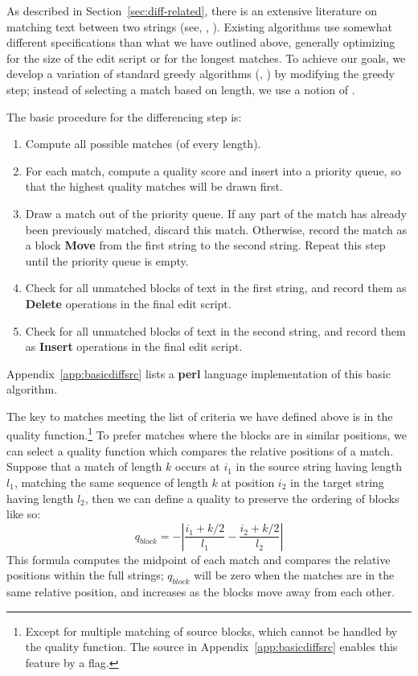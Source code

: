 As described in Section~\ref{sec:diff-related}, there is an extensive
literature on matching text between two strings (see, \eg,
\cite{Hunt1976,Hirschberg1977,Tichy1984,Myers1986,Burns1997}).
Existing algorithms use somewhat different specifications than what
we have outlined above, generally optimizing for the size of the edit
script or for the longest matches.
To achieve our goals, we develop a variation of
standard greedy algorithms (\eg, \cite{Hirschberg1977,Myers1986,Burns1997})
by modifying the greedy step; instead of selecting a match
based on length, we use a notion of .

The basic procedure for the differencing step is:
\begin{enumerate}
\item Compute all possible matches (of every length).
\item For each match, compute a quality score and insert into
    a priority queue, so that the highest quality matches will
    be drawn first.
\item Draw a match out of the priority queue.
    If any part of the match has already been previously matched,
    discard this match.
    Otherwise, record the match as a block \textbf{Move}
    from the first string to the second string.
    Repeat this step until the priority queue is empty.
\item Check for all unmatched blocks of text in the first
    string, and record them as \textbf{Delete} operations
    in the final edit script.
\item Check for all unmatched blocks of text in the second
    string, and record them as \textbf{Insert} operations
    in the final edit script.
\end{enumerate}
Appendix~\ref{app:basicdiffsrc} lists a
\textbf{perl} language implementation of this basic algorithm.

The key to matches meeting the list of criteria we have
defined above is in the quality function.\footnote{Except for
multiple matching of source blocks, which cannot be handled
by the quality
function.  The source in Appendix~\ref{app:basicdiffsrc}
enables this feature by a flag.}
To prefer matches where the blocks are in similar positions,
we can select a quality function which compares the relative
positions of a match.
Suppose that a match of length $k$ occurs at $i_1$ in the source
string having length $l_1$, matching the same sequence of length $k$ at
position $i_2$ in the target string having length $l_2$,
then we can define a quality to preserve the
ordering of blocks like so:
\begin{equation}
q_{block} = -\left| \frac{i_1 + k/2}{l_1} - \frac{i_2 + k/2}{l_2} \right|
\end{equation}
This formula computes the midpoint of each match and compares
the relative positions within the full strings; $q_{block}$ will be
zero when the matches are in the same relative position,
and increases as the blocks move away from each other.

